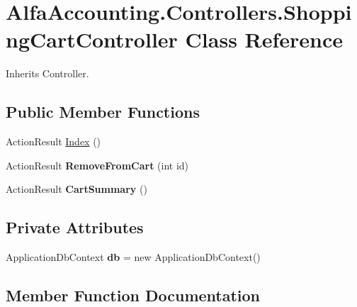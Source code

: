 \hypertarget{class_alfa_accounting_1_1_controllers_1_1_shopping_cart_controller}{}\section{Alfa\+Accounting.\+Controllers.\+Shopping\+Cart\+Controller Class Reference}
\label{class_alfa_accounting_1_1_controllers_1_1_shopping_cart_controller}


Inherits Controller.

\subsection*{Public Member Functions}
\begin{DoxyCompactItemize}
\item 
Action\+Result \hyperlink{class_alfa_accounting_1_1_controllers_1_1_shopping_cart_controller_a3ee583697586ac5f7a9a5f50ff28ceba}{Index} ()
\item 
\mbox{\label{class_alfa_accounting_1_1_controllers_1_1_shopping_cart_controller_afe20c5b6bebe3440f9fc809d8e14b3e8}} 
Action\+Result {\bfseries Remove\+From\+Cart} (int id)
\item 
\mbox{\label{class_alfa_accounting_1_1_controllers_1_1_shopping_cart_controller_ab35f5f69f9592a32698b0a843bcc62af}} 
Action\+Result {\bfseries Cart\+Summary} ()
\end{DoxyCompactItemize}
\subsection*{Private Attributes}
\begin{DoxyCompactItemize}
\item 
\mbox{\label{class_alfa_accounting_1_1_controllers_1_1_shopping_cart_controller_a5d9200bcd62bc2fc1dc1b5d33e05ec74}} 
Application\+Db\+Context {\bfseries db} = new Application\+Db\+Context()
\end{DoxyCompactItemize}


\subsection{Member Function Documentation}
\mbox{\label{class_alfa_accounting_1_1_controllers_1_1_shopping_cart_controller_a3ee583697586ac5f7a9a5f50ff28ceba}} 
